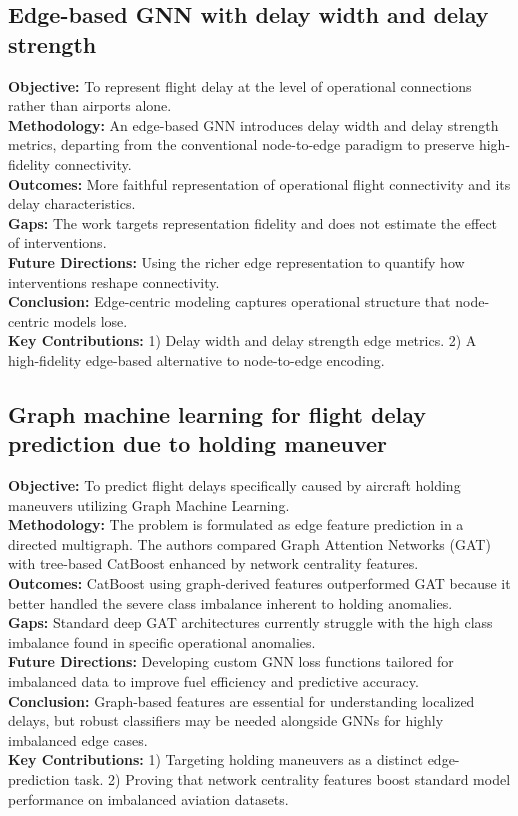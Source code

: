 \documentclass[twocolumn]{article}
\begin{document}
\subsection{Edge-based GNN with delay width and delay strength \cite{tang2026}}
\textbf{Objective:} To represent flight delay at the level of operational connections rather than airports alone. \\
\textbf{Methodology:} An edge-based GNN introduces delay width and delay strength metrics, departing from the conventional node-to-edge paradigm to preserve high-fidelity connectivity. \\
\textbf{Outcomes:} More faithful representation of operational flight connectivity and its delay characteristics. \\
\textbf{Gaps:} The work targets representation fidelity and does not estimate the effect of interventions. \\
\textbf{Future Directions:} Using the richer edge representation to quantify how interventions reshape connectivity. \\
\textbf{Conclusion:} Edge-centric modeling captures operational structure that node-centric models lose. \\
\textbf{Key Contributions:} 1) Delay width and delay strength edge metrics. 2) A high-fidelity edge-based alternative to node-to-edge encoding.

\subsection{Graph machine learning for flight delay prediction due to holding maneuver \cite{franco2026}}
\textbf{Objective:} To predict flight delays specifically caused by aircraft holding maneuvers utilizing Graph Machine Learning. \\
\textbf{Methodology:} The problem is formulated as edge feature prediction in a directed multigraph. The authors compared Graph Attention Networks (GAT) with tree-based CatBoost enhanced by network centrality features. \\
\textbf{Outcomes:} CatBoost using graph-derived features outperformed GAT because it better handled the severe class imbalance inherent to holding anomalies. \\
\textbf{Gaps:} Standard deep GAT architectures currently struggle with the high class imbalance found in specific operational anomalies. \\
\textbf{Future Directions:} Developing custom GNN loss functions tailored for imbalanced data to improve fuel efficiency and predictive accuracy. \\
\textbf{Conclusion:} Graph-based features are essential for understanding localized delays, but robust classifiers may be needed alongside GNNs for highly imbalanced edge cases. \\
\textbf{Key Contributions:} 1) Targeting holding maneuvers as a distinct edge-prediction task. 2) Proving that network centrality features boost standard model performance on imbalanced aviation datasets.
\end{document}
